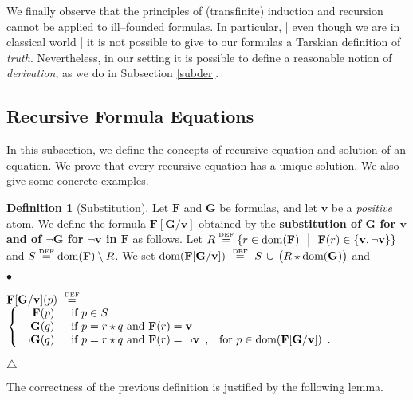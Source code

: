 \documentclass[copyright,creativecommons]{eptcs}
\newcommand{\eqdef}{\stackrel{\text{\tiny \textnormal{DEF}}}{=}}
\newcommand{\st}{ \ \ \big{|} \ \ }
\newcommand{\bF}{\mathbf{F}}
\newcommand{\bG}{\mathbf{G}}
\newcommand{\bbv}{\mathbf{v}}
\newcommand{\dom}{\ensuremath{\textnormal{dom}}}
\theoremstyle{definition}
\newtheorem{Definition}[theorem]{Definition}
\newcommand{\squishlist}{
 \begin{list}{$\bullet$}
  { \setlength{\itemsep}{0pt}
     \setlength{\parsep}{3pt}
     \setlength{\topsep}{3pt}
     \setlength{\partopsep}{0pt}
     \setlength{\leftmargin}{1em}
     \setlength{\labelwidth}{1.5em}
     \setlength{\labelsep}{0.5em} } }
\newcommand{\squishend}{
  \end{list}  }
\begin{document}
We finally observe that
the principles of (transfinite)
induction and recursion cannot be applied to
ill--founded
formulas.  In particular, | even though we are in classical world | it is not possible to give to our formulas
a Tarskian definition of \emph{truth}. Nevertheless, in our setting it is possible to
define a reasonable notion of \emph{derivation}, as we do  in
 Subsection  \ref{subder}.

 \subsection{Recursive Formula Equations} \label{receqsec}
In this subsection, we  define the concepts of recursive equation and solution of an equation. We
 prove  that every recursive equation
has a unique solution. We also give some concrete examples.








\begin{Definition}[Substitution] \label{subdef}
Let $\bF$ and $\bG$ be  formulas, and let $\bbv$ be a
\emph{positive} atom.
We define the formula $\bF[\bG/\bbv]$
obtained by the \textbf{substitution of $\bG$ for $\bbv$ and
of $\neg\bG$ for $\neg \bbv$ in $\bF$} as follows.
Let $ R \eqdef \{ r \in \dom(\bF) \st {\bF}(r) \in \{\bbv, \neg \bbv\}  \}$
and $S \eqdef \dom(\bF) \setminus R$.
We set $\dom(\bF[\bG/\bbv]) \ \eqdef \ S \, \cup \, \big(R \star  \dom(\bG) \big)$ and

\squishlist
\item[]
{\centering
$\bF[\bG/\bbv](p) \ \eqdef \ $ $\left\{
  \begin{array}{rl}
  {\bF}(p)\enspace &  \hbox{if  $p \in S$} \\
     {\bG}(q)\enspace &  \hbox{if  $p = r \star q$ and   $\bF(r) = \bbv$} \\
  \neg{\bG}(q)\enspace &  \hbox{if  $p = r \star q$ and   $\bF(r) = \neg \bbv$\enspace, \ \  for  $p \in \dom(\bF[\bG/\bbv])$\enspace. }   \end{array}
\right.$

\vspace{-0.53cm}
\hfill$\triangle$ \par}
\squishend
\end{Definition}
The correctness of the previous definition is justified by the following lemma.
\end{document}
